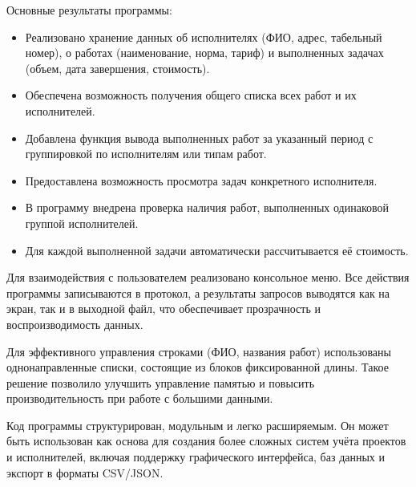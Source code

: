 \documentclass[12pt,a4paper]{extarticle}
\begin{document}
Основные результаты программы:
\begin{itemize}
    \item Реализовано хранение данных об исполнителях (ФИО, адрес,
          табельный номер), о работах (наименование, норма, тариф)
          и выполненных задачах (объем, дата завершения, стоимость).
    \item Обеспечена возможность получения общего списка всех работ
          и их исполнителей.
    \item Добавлена функция вывода выполненных работ за указанный период
          с группировкой по исполнителям или типам работ.
    \item Предоставлена возможность просмотра задач конкретного
          исполнителя.
    \item В программу внедрена проверка наличия работ, выполненных
          одинаковой группой исполнителей.
    \item Для каждой выполненной задачи автоматически рассчитывается
          её стоимость.
\end{itemize}

\medskip

Для взаимодействия с пользователем реализовано консольное меню.
Все действия программы записываются в протокол, а результаты
запросов выводятся как на экран, так и в выходной файл, что
обеспечивает прозрачность и воспроизводимость данных.

\medskip

Для эффективного управления строками (ФИО, названия работ)
использованы однонаправленные списки, состоящие из блоков
фиксированной длины. Такое решение позволило улучшить управление
памятью и повысить производительность при работе с большими данными.

\medskip

Код программы структурирован, модульным и легко расширяемым. Он
может быть использован как основа для создания более сложных систем
учёта проектов и исполнителей, включая поддержку графического
интерфейса, баз данных и экспорт в форматы CSV/JSON.
\end{document}

